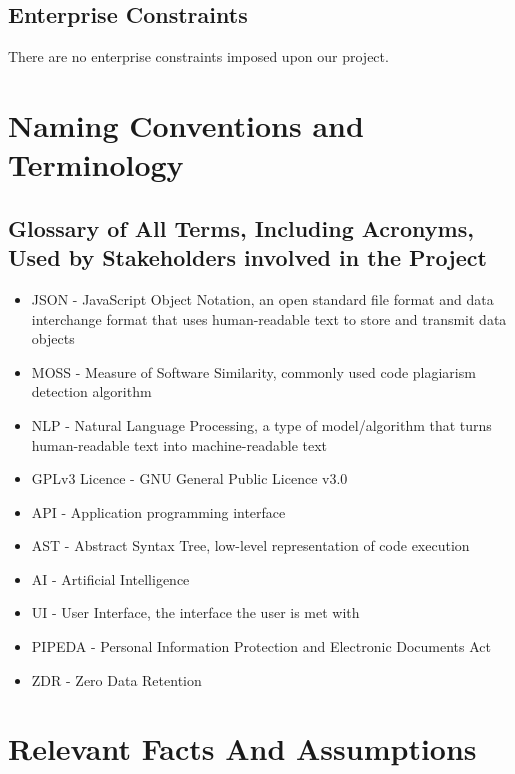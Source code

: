 \documentclass[12pt]{article}
\begin{document}
\subsection{Enterprise Constraints}
There are no enterprise constraints imposed upon our project.

\section{Naming Conventions and Terminology}
\subsection{Glossary of All Terms, Including Acronyms, Used by Stakeholders
involved in the Project}
\begin{itemize}
    \item JSON - JavaScript Object Notation, an open standard file format and data interchange format that uses human-readable text to store and transmit data objects
    \item MOSS - Measure of Software Similarity, commonly used code plagiarism detection algorithm
    \item NLP - Natural Language Processing, a type of model/algorithm that turns human-readable text into machine-readable text
    \item GPLv3 Licence - GNU General Public Licence v3.0
    \item API - Application programming interface
    \item AST - Abstract Syntax Tree, low-level representation of code execution
    \item AI - Artificial Intelligence
    \item UI - User Interface, the interface the user is met with
    \item PIPEDA - Personal Information Protection and Electronic Documents Act
    \item ZDR - Zero Data Retention
\end{itemize}

\section{Relevant Facts And Assumptions}
\end{document}
